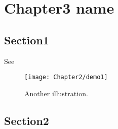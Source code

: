 
\chapter{Chapter3 name} %
\label{ch:doptim_netsys} %




\section{Section1}\label{sec:top_opt_model}

 
 See 

\begin{figure}[!htbp]
  \centering
    \texttt{[image: Chapter2/demo1]}
  \caption{Another illustration.}
  \label{fig:demo2}
\end{figure}


\section{Section2}\label{sec:canonical_dopt}

